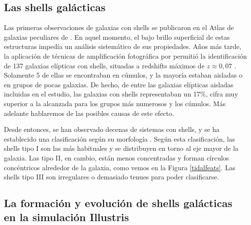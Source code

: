 \subsection{Las shells galácticas}
Las primeras observaciones de galaxias con shells se publicaron en el Atlas de galaxias peculiares de \citet{arpAtlasPeculiarGalaxies1966}. En aquel momento, el bajo brillo superficial de estas estructuras impedía un análisis sistemático de sus propiedades. Años más tarde, la aplicación de técnicas de amplificación fotográfica por \cite{malinCatalogEllipticalGalaxies1983} permitió la identificación de 137 galaxias elípticas con shells, situadas a redshifts máximos de \(z \approx 0,07\) \citep{carterSpectraShellEllipticals1988}. Solamente 5 de ellas se encontraban en cúmulos, y la mayoría estaban aisladas o en grupos de pocas galaxias. De hecho, de entre las galaxias elípticas aisladas incluidas en el estudio, las galaxias con shells representaban un 17\%, cifra muy superior a la alcanzada para los grupos más numerosos y los cúmulos. Más adelante hablaremos de las posibles causas de este efecto. \par


Desde entonces, se han observado decenas de sistemas con shells, y se ha establecido una clasificación según su morfología \citep{popFormationIncidenceShell2018}. Según esta clasificación, las shells tipo I son las más habituales y se distribuyen en torno al eje mayor de la galaxia. Las tipo II, en cambio, están menos concentradas y forman círculos concéntricos alrededor de la galaxia, como vemos en la Figura \ref{tidalfeats}. Las shells tipo III son irregulares o demasiado tenues para poder clasificarse. \par

\subsection{La formación y evolución de shells galácticas en la simulación Illustris}

